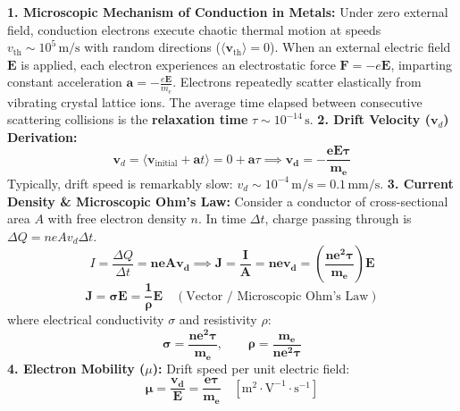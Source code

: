 \documentclass[10pt,a4paper]{article}
\begin{document}
\begin{conceptbox}
\textbf{1. Microscopic Mechanism of Conduction in Metals:}
Under zero external field, conduction electrons execute chaotic thermal motion at speeds $v_{\text{th}} \sim 10^5\,\mathrm{m/s}$ with random directions ($\langle \mathbf{v}_{\text{th}} \rangle = 0$).
When an external electric field $\mathbf{E}$ is applied, each electron experiences an electrostatic force $\mathbf{F} = -e\mathbf{E}$, imparting constant acceleration $\mathbf{a} = -\frac{e\mathbf{E}}{m_e}$.
Electrons repeatedly scatter elastically from vibrating crystal lattice ions. The average time elapsed between consecutive scattering collisions is the \textbf{relaxation time} $\tau \sim 10^{-14}\,\mathrm{s}$.
\textbf{2. Drift Velocity ($\mathbf{v}_d$) Derivation:}
\begin{equation}
  \mathbf{v}_d = \langle \mathbf{v}_{\text{initial}} + \mathbf{a} t \rangle = 0 + \mathbf{a}\tau \implies \mathbf{\mathbf{v}_d = -\frac{e \mathbf{E} \tau}{m_e}}
\end{equation}
Typically, drift speed is remarkably slow: $v_d \sim 10^{-4}\,\mathrm{m/s} = 0.1\,\mathrm{mm/s}$.
\textbf{3. Current Density \& Microscopic Ohm's Law:}
Consider a conductor of cross-sectional area $A$ with free electron density $n$. In time $\Delta t$, charge passing through is $\Delta Q = n e A v_d \Delta t$.
\begin{equation}
  I = \frac{\Delta Q}{\Delta t} = \mathbf{n e A v_d} \implies \mathbf{J = \frac{I}{A} = n e v_d = \left(\frac{n e^2 \tau}{m_e}\right) E}
\end{equation}
\begin{equation}
  \mathbf{\mathbf{J} = \sigma \mathbf{E} = \frac{1}{\rho}\mathbf{E}} \quad (\text{Vector / Microscopic Ohm's Law})
\end{equation}
where electrical conductivity $\sigma$ and resistivity $\rho$:
\begin{equation}
  \mathbf{\sigma = \frac{n e^2 \tau}{m_e}}, \qquad \mathbf{\rho = \frac{m_e}{n e^2 \tau}}
\end{equation}
\textbf{4. Electron Mobility ($\mu$):}
Drift speed per unit electric field:
\begin{equation}
  \mathbf{\mu = \frac{v_d}{E} = \frac{e \tau}{m_e}} \quad [\mathrm{m}^2\cdot\mathrm{V}^{-1}\cdot\mathrm{s}^{-1}]
\end{equation}
\end{conceptbox}
\end{document}
